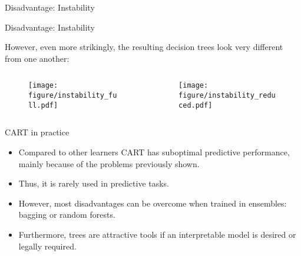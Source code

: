 \documentclass[11pt,compress,t,notes=noshow, xcolor=table]{beamer}
\begin{document}
\begin{vbframe}{Disadvantage: Instability}


\end{vbframe}

\begin{vbframe}{Disadvantage: Instability}

However, even more strikingly, the resulting decision trees look very different from one another:

\begin{columns}
\begin{column}{0.5\textwidth}
\begin{figure}
\texttt{[image: figure/instability\_full.pdf]} 
\end{figure}
\end{column}
\begin{column}{0.5\textwidth}
\begin{figure}
\texttt{[image: figure/instability\_reduced.pdf]} 
\end{figure}
\end{column}
\end{columns}

\end{vbframe}

\begin{vbframe}{CART in practice}

\begin{itemize}
\item Compared to other learners CART has suboptimal predictive performance, mainly because of the problems previously shown.
\item Thus, it is rarely used in predictive tasks.
\item However, most disadvantages can be overcome when trained in ensembles: bagging or random forests.
\item Furthermore, trees are attractive tools if an interpretable model is desired or legally required.
\end{itemize}



\end{vbframe}
\end{document}
